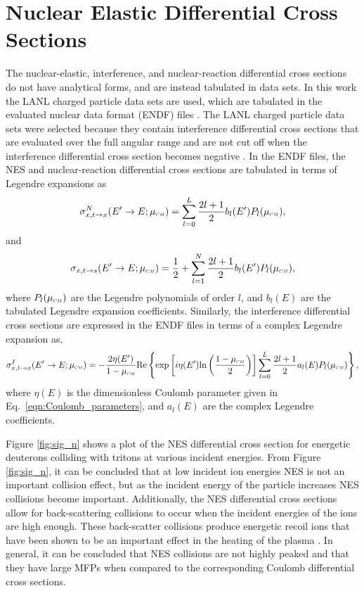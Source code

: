 \section{Nuclear Elastic Differential Cross Sections}
The nuclear-elastic, interference, and nuclear-reaction differential cross sections do not have analytical forms, and are instead tabulated in data sets. In this work the LANL charged particle data sets are used, which are tabulated in the evaluated nuclear data format (ENDF) files \cite{Brown-2018}. The LANL charged particle data sets were selected because they contain interference differential cross sections that are evaluated over the full angular range and are not cut off when the interference differential cross section becomes negative \cite{Perkins-1981} \cite{Hale-1983}. In the ENDF files, the NES and nuclear-reaction differential cross sections are tabulated in terms of Legendre expansions as
\begin{equation} \label{eqn:nes_differential cross section}
    \sigma_{x,t \rightarrow x}^N(E^{\prime} \rightarrow E; \mucm) = \sum_{l=0}^L \dfrac{2l+1}{2} b_l(E^{\prime}) P_l(\mucm),
\end{equation}
and
\begin{equation}\label{eqn:nuclear-reaction_differential cross section}
    \sigma_{x,t \rightarrow s}(E^{\prime} \rightarrow E; \mucm) = \dfrac{1}{2} + \sum_{l=1}^N \dfrac{2l+1}{2} b_l(E^{\prime}) P_l(\mucm),
\end{equation}
where $P_l(\mucm)$ are the Legendre polynomials of order $l$, and $b_l(E)$ are the tabulated Legendre expansion coefficients. Similarly, the interference differential cross sections are expressed in the ENDF files in terms of a complex Legendre expansion as,
\begin{equation} \label{eqn:interference_differential cross section}
    \sigma_{x,t \rightarrow x}^I(E^{\prime} \rightarrow E; \mucm) = -\dfrac{2 \eta(E^{\prime})}{1 - \mucm} \text{Re} \left\lbrace \text{exp}\left[ i \eta(E^{\prime}) \text{ln}\left(\frac{1 - \mucm}{2} \right)\right] \sum_{l=0}^L \dfrac{2l+1}{2} a_l(E) P_l(\mucm) \right\rbrace,
\end{equation}
where $\eta(E)$ is the dimensionless Coulomb parameter given in Eq.~\eqref{eqn:Coulomb_parameters}, and $a_l(E)$ are the complex Legendre coefficients.

Figure \ref{fig:sig_n} shows a plot of the NES differential cross section for energetic deuterons colliding with tritons at various incident energies. From Figure \ref{fig:sig_n}, it can be concluded that at low incident ion energies NES is not an important collision effect, but as the incident energy of the particle increases NES collisions become important. Additionally, the NES differential cross sections allow for back-scattering collisions to occur when the incident energies of the ions are high enough. These back-scatter collisions produce energetic recoil ions that have been shown to be an important effect in the heating of the plasma \cite{Nakao-1988}. In general, it can be concluded that NES collisions are not highly peaked and that they have large MFPs when compared to the corresponding Coulomb differential cross sections.

